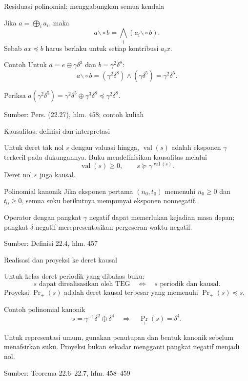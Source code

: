 \documentclass[aspectratio=169,11pt]{beamer}
\newcommand{\source}[1]{%
    \vfill
    \hfill{\tiny\color{gray}Sumber: #1}
}
\newcommand{\eps}{\varepsilon}
\newcommand{\res}{\mathbin{\backslash\!\circ}}
\begin{document}
\begin{frame}{Residuasi polinomial: menggabungkan semua kendala}

Jika $a=\bigoplus_i a_i$, maka
\[
a\res b=\bigwedge_i(a_i\res b).
\]
Sebab $ax\preceq b$ harus berlaku untuk setiap kontribusi $a_ix$.
\begin{exampleblock}{Contoh}
Untuk $a=e\oplus\gamma\delta^3$ dan $b=\gamma^2\delta^8$:
\[
a\res b=(\gamma^2\delta^8)\wedge(\gamma\delta^5)
=\gamma^2\delta^5.
\]
\end{exampleblock}
Periksa $a(\gamma^2\delta^5)
=\gamma^2\delta^5\oplus\gamma^3\delta^8\preceq\gamma^2\delta^8$.

\source{Pers. (22.27), hlm. 458; contoh kuliah}
\end{frame}
\begin{frame}{Kausalitas: definisi dan interpretasi}

Untuk deret tak nol $s$ dengan valuasi hingga,
$\operatorname{val}(s)$ adalah eksponen $\gamma$ terkecil pada dukungannya.
Buku mendefinisikan kausalitas melalui
\[
\operatorname{val}(s)\ge0,\qquad
s\succeq\gamma^{\operatorname{val}(s)}.
\]
Deret nol $\eps$ juga kausal.
\begin{exampleblock}{Polinomial kanonik}
Jika eksponen pertama $(n_0,t_0)$ memenuhi $n_0\ge0$ dan $t_0\ge0$,
semua suku berikutnya mempunyai eksponen nonnegatif.
\end{exampleblock}
Operator dengan pangkat $\gamma$ negatif dapat memerlukan kejadian masa depan;
pangkat $\delta$ negatif merepresentasikan pergeseran waktu negatif.

\source{Definisi 22.4, hlm. 457}
\end{frame}
\begin{frame}{Realisasi dan proyeksi ke deret kausal}

Untuk kelas deret periodik yang dibahas buku:
\[
s\text{ dapat direalisasikan oleh TEG}
\quad\Longleftrightarrow\quad
s\text{ periodik dan kausal}.
\]
Proyeksi $\operatorname{Pr}_+(s)$ adalah deret kausal terbesar yang memenuhi
$\operatorname{Pr}_+(s)\preceq s$.
\begin{exampleblock}{Contoh polinomial kanonik}
\[
s=\gamma^{-1}\delta^2\oplus\delta^4
\quad\Longrightarrow\quad
\operatorname{Pr}_+(s)=\delta^4.
\]
\end{exampleblock}
Untuk representasi umum, gunakan penutupan dan bentuk kanonik sebelum
menafsirkan suku. Proyeksi bukan sekadar mengganti pangkat negatif menjadi nol.

\source{Teorema 22.6--22.7, hlm. 458--459}
\end{frame}
\end{document}
